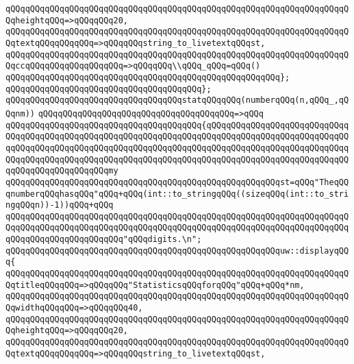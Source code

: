 \verb|qQQqqQQqqQQqqQQqqQQqqQQqqQQqqQQqqQQqqQQqqQQqqQQqqQQqqQQqqQQqqQQqqQQqqQQqheightqQQq=>qQQqqQQq20,|\newline
\verb|qQQqqQQqqQQqqQQqqQQqqQQqqQQqqQQqqQQqqQQqqQQqqQQqqQQqqQQqqQQqqQQqqQQqqQQqtextqQQqqQQqqQQq=>qQQqqQQqstring_to_livetextqQQqst,|\newline
\verb|qQQqqQQqqQQqqQQqqQQqqQQqqQQqqQQqqQQqqQQqqQQqqQQqqQQqqQQqqQQqqQQqqQQqqQQqccqQQqqQQqqQQqqQQqqQQq=>qQQqqQQq\\qQQq_qQQq=qQQq()|\newline
\verb|qQQqqQQqqQQqqQQqqQQqqQQqqQQqqQQqqQQqqQQqqQQqqQQqqQQqqQQq};|\newline
\verb|qQQqqQQqqQQqqQQqqQQqqQQqqQQqqQQqqQQqqQQq};|\newline
\newline
\verb|qQQqqQQqqQQqqQQqqQQqqQQqqQQqqQQqqQQqstatqQQqqQQq(numberqQQq(n,qQQq_,qQQqnm))|\newline
\verb|qQQqqQQqqQQqqQQqqQQqqQQqqQQqqQQqqQQqqQQq=>qQQq|\newline
\verb|qQQqqQQqqQQqqQQqqQQqqQQqqQQqqQQqqQQqqQQq{qQQqqQQqqQQqqQQqqQQqqQQqqQQqqQQqqQQqqQQqqQQqqQQqqQQqqQQqqQQqqQQqqQQqqQQqqQQqqQQqqQQqqQQqqQQqqQQqqQQqqQQqqQQqqQQqqQQqqQQqqQQqqQQqqQQqqQQqqQQqqQQqqQQqqQQqqQQqqQQqqQQqqQQqqQQqqQQqqQQqqQQqqQQqqQQqqQQqqQQqqQQqqQQqqQQqqQQqqQQqqQQqqQQqqQQqqQQqqQQqqQQqqQQqqQQqqQQqqQQqmy|\newline
\verb|qQQqqQQqqQQqqQQqqQQqqQQqqQQqqQQqqQQqqQQqqQQqqQQqqQQqqQQqst=qQQq"TheqQQqnumberqQQqhasqQQq"qQQq+qQQq(int::to_stringqQQq((sizeqQQq(int::to_stringqQQqn))-1))qQQq+qQQq|\newline
\verb|qQQqqQQqqQQqqQQqqQQqqQQqqQQqqQQqqQQqqQQqqQQqqQQqqQQqqQQqqQQqqQQqqQQqqQQqqQQqqQQqqQQqqQQqqQQqqQQqqQQqqQQqqQQqqQQqqQQqqQQqqQQqqQQqqQQqqQQqqQQqqQQqqQQqqQQqqQQqqQQqqQQq"qQQqdigits.\n";|\newline
\newline
\verb|qQQqqQQqqQQqqQQqqQQqqQQqqQQqqQQqqQQqqQQqqQQqqQQqqQQqqQQquw::displayqQQq{|\newline
\verb|qQQqqQQqqQQqqQQqqQQqqQQqqQQqqQQqqQQqqQQqqQQqqQQqqQQqqQQqqQQqqQQqqQQqqQQqtitleqQQqqQQq=>qQQqqQQq"StatisticsqQQqforqQQq"qQQq+qQQq*nm,|\newline
\verb|qQQqqQQqqQQqqQQqqQQqqQQqqQQqqQQqqQQqqQQqqQQqqQQqqQQqqQQqqQQqqQQqqQQqqQQqwidthqQQqqQQq=>qQQqqQQq40,|\newline
\verb|qQQqqQQqqQQqqQQqqQQqqQQqqQQqqQQqqQQqqQQqqQQqqQQqqQQqqQQqqQQqqQQqqQQqqQQqheightqQQq=>qQQqqQQq20,|\newline
\verb|qQQqqQQqqQQqqQQqqQQqqQQqqQQqqQQqqQQqqQQqqQQqqQQqqQQqqQQqqQQqqQQqqQQqqQQqtextqQQqqQQqqQQq=>qQQqqQQqstring_to_livetextqQQqst,|\newline
